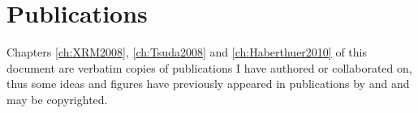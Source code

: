 \chapter*{Publications}
Chapters \ref{ch:XRM2008}, \ref{ch:Tsuda2008} and \ref{ch:Haberthuer2010} of this document are verbatim copies of publications I have authored or collaborated on, thus some ideas and figures have previously appeared in publications by \citet{Haberthuer2009,Tsuda2008} and \citet{Haberthuer2010} and may be copyrighted.